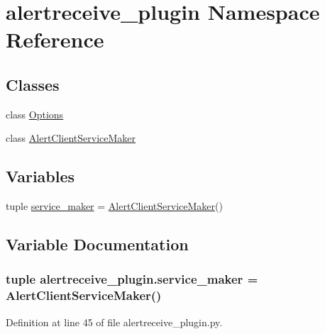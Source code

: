 \hypertarget{namespacealertreceive__plugin}{\section{alertreceive\-\_\-plugin Namespace Reference}
\label{namespacealertreceive__plugin}
}
\subsection*{Classes}
\begin{DoxyCompactItemize}
\item 
class \hyperlink{classalertreceive__plugin_1_1_options}{Options}
\item 
class \hyperlink{classalertreceive__plugin_1_1_alert_client_service_maker}{Alert\-Client\-Service\-Maker}
\end{DoxyCompactItemize}
\subsection*{Variables}
\begin{DoxyCompactItemize}
\item 
tuple \hyperlink{namespacealertreceive__plugin_a40ac7938cc417d1d27c5e4611849be12}{service\-\_\-maker} = \hyperlink{classalertreceive__plugin_1_1_alert_client_service_maker}{Alert\-Client\-Service\-Maker}()
\end{DoxyCompactItemize}


\subsection{Variable Documentation}
\hypertarget{namespacealertreceive__plugin_a40ac7938cc417d1d27c5e4611849be12}{
\subsubsection[{service\-\_\-maker}]{\setlength{\rightskip}{0pt plus 5cm}tuple alertreceive\-\_\-plugin.\-service\-\_\-maker = {\bf Alert\-Client\-Service\-Maker}()}}\label{namespacealertreceive__plugin_a40ac7938cc417d1d27c5e4611849be12}


Definition at line 45 of file alertreceive\-\_\-plugin.\-py.


